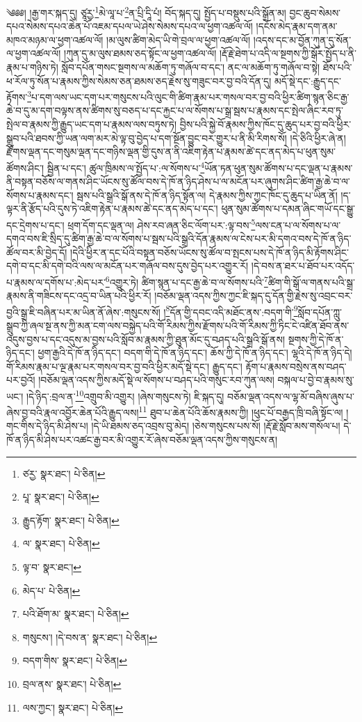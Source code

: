 \setcounter{footnote}{0} 
༄༅༅། །རྒྱ་གར་སྐད་དུ། ཙཱརྱ་\footnote{ཙརྱ་  སྣར་ཐང་།  པེ་ཅིན། }མེ་ལཱ་པ་\footnote{པཱ་  སྣར་ཐང་།  པེ་ཅིན། }ན་པྲི་དཱི་པཾ། བོད་སྐད་དུ། སྤྱོད་པ་བསྡུས་པའི་སྒྲོན་མ། བྱང་ཆུབ་སེམས་དཔའ་སེམས་དཔའ་ཆེན་པོ་འཇམ་དཔལ་ཡེ་ཤེས་སེམས་དཔའ་ལ་ཕྱག་འཚལ་ལོ། །དངོས་མེད་རྣམ་དག་ནམ་མཁའ་མཉམ་ལ་ཕྱག་འཚལ་ལོ། །མ་ལུས་ཚིག་མེད་ཡི་གེ་བྲལ་ལ་ཕྱག་འཚལ་ལོ། །འདས་དང་མ་བྱོན་ཀུན་དུ་སོན་ལ་ཕྱག་འཚལ་ལོ། །ཀུན་དུ་མ་ལུས་ཐམས་ཅད་སྟོང་ལ་ཕྱག་འཚལ་ལོ། །རྡོ་རྗེ་ཐེག་པ་འདི་ལ་སྔགས་ཀྱི་སྒོར་སྤྱོད་པ་ནི་རྣམ་པ་གཉིས་ཏེ། སློབ་དཔོན་གསང་སྔགས་ལ་མཆོག་ཏུ་གཞོལ་བ་དང་། ནང་ལ་མཆོག་ཏུ་གཞོལ་བ་སྟེ། ཐོས་པའི་ཕ་རོལ་ཏུ་སོན་པ་རྣམས་ཀྱིས་སེམས་ཅན་ཐམས་ཅད་རྗེས་སུ་གཟུང་བར་བྱ་བའི་དོན་དུ། མདོ་སྡེ་དང་:རྒྱུད་དང་རྟོགས་\footnote{རྒྱུད་རྟོག་  སྣར་ཐང་།  པེ་ཅིན། }པ་དག་ལས་ཡང་དག་པར་གསུངས་པའི་ལུང་གི་ཚིག་རྣམ་པར་གསལ་བར་བྱ་བའི་ཕྱིར་ཚིག་སྙན་ཅིང་རྒྱ་ཆེ་བ་དུ་མ་དག་བལྟས་ནས་ཚིགས་སུ་བཅད་པ་དང་རྐྱང་པ་ལ་སོགས་པ་སྒྲ་སྦས་པ་རྣམས་དང་སྤེལ་ཞིང་རབ་ཏུ་སྤེལ་བ་རྣམས་ཀྱི་རྒྱུད་ཡང་དག་པ་རྣམས་ལས་བཏུས་ཏེ། བྱིས་པའི་སྐྱེ་བོ་རྣམས་ཀྱིས་ཁོང་དུ་ཆུད་པར་བྱ་བའི་ཕྱིར་སྒྲུབ་པའི་ཐབས་ཀྱི་ཡན་ལག་མར་མེ་ལྟ་བུ་བྱེད་པ་དག་སྔོན་བྱུང་བར་གྱུར་པ་ནི་མི་རིགས་སོ། །དེ་ཅིའི་ཕྱིར་ཞེ་ན། རྫོགས་ལྡན་དང་གསུམ་ལྡན་དང་གཉིས་ལྡན་གྱི་དུས་ན་ནི་འཇིག་རྟེན་པ་རྣམས་ཚེ་དང་ནད་མེད་པ་ཕུན་སུམ་ཚོགས་ཤིང་། སྦྱིན་པ་དང་། ཚུལ་ཁྲིམས་ལ་སྤྱོད་པ་:ལ་སོགས་པ་\footnote{ལ་  སྣར་ཐང་།  པེ་ཅིན། }ཡོན་ཏན་ཕུན་སུམ་ཚོགས་པ་དང་ལྡན་པ་རྣམས་ནི་བསྟན་བཅོས་ལ་གནས་ཤིང་ཡོངས་སུ་ཚོལ་བས་དེ་ཁོ་ན་ཉིད་ཤེས་པ་ལ་མངོན་པར་ཞུགས་ཤིང་ཚིག་རྒྱ་ཆེ་བ་ལ་སོགས་པ་རྣམས་དང་། སྦས་པའི་སྒྲའི་སྒོ་ནས་དེ་ཁོ་ན་ཉིད་སྟོན་ལ། དེ་རྣམས་ཀྱིས་ཀྱང་ཁོང་དུ་ཆུད་པ་ཡིན་ནོ། །ད་ལྟར་ནི་རྩོད་པའི་དུས་ཏེ་འཇིག་རྟེན་པ་རྣམས་ཚེ་དང་ནད་མེད་པ་དང་། ཕུན་སུམ་ཚོགས་པ་དམན་ཞིང་གཡོ་དང་སྒྱུ་དང་དྲེགས་པ་དང་། ཕྲག་དོག་དང་ལྡན་ལ། ཤེས་རབ་ཞན་ཅིང་ལོག་པར་:ལྟ་བས་\footnote{ལྟ་བ་  སྣར་ཐང་། }ལས་ངན་པ་ལ་སོགས་པ་ལ་དགའ་བས་ཇི་སྲིད་དུ་ཚིག་རྒྱ་ཆེ་བ་ལ་སོགས་པ་སྦས་པའི་སྒྲའི་དོན་རྣམས་ལ་ངེས་པར་མི་དགའ་བས་དེ་ཁོ་ན་ཉིད་ཚོལ་བར་མི་བྱེད་དོ། །དེའི་ཕྱིར་ན་དང་པོའི་བསྟན་བཅོས་ཡོངས་སུ་ཚོལ་བ་སྤངས་པས་དེ་ཁོ་ན་ཉིད་མི་རྟོགས་ཤིང་དགེ་བ་དང་མི་དགེ་བའི་ལས་ལ་མངོན་པར་གཞོལ་བས་དུས་བྱེད་པར་འགྱུར་རོ། །དེ་བས་ན་ཐར་པ་ཐོབ་པར་འདོད་པ་རྣམས་ལ་དགོས་པ་:མེད་པར་\footnote{མེད་པ་  པེ་ཅིན། }འགྱུར་ཏེ། ཚིག་སྙན་པ་དང་རྒྱ་ཆེ་བ་ལ་སོགས་པའི་\footnote{པའི་ཐོག་མ་  སྣར་ཐང་།  པེ་ཅིན། }ཚིག་གི་སྒོ་ལ་གནས་པའི་སྒྲ་རྣམས་ནི་གཟིངས་དང་འདྲ་བ་ཡིན་པའི་ཕྱིར་རོ། །བཅོམ་ལྡན་འདས་ཀྱིས་ཀྱང་ཇི་སྐད་དུ་དོན་གྱི་རྗེས་སུ་འབྲང་བར་བྱའི་སྒྲ་ཇི་བཞིན་པར་མ་ཡིན་ནོ་ཞེས་:གསུངས་སོ། །\footnote{གསུངས་། །དེ་བས་ན་  སྣར་ཐང་།  པེ་ཅིན། }དོན་གྱི་དབང་འདི་མཐོང་ནས་:བདག་གི་\footnote{བདག་གིས་  སྣར་ཐང་།  པེ་ཅིན། }སློབ་དཔོན་ཀླུ་སྒྲུབ་ཀྱི་ཞལ་སྔ་ནས་ཀྱི་མན་ངག་ལས་བསྐྱེད་པའི་གོ་རིམས་ཀྱིས་རྫོགས་པའི་གོ་རིམས་ཀྱི་ཏིང་ངེ་འཛིན་ཐོབ་ནས་འདུས་བྱས་པ་དང་འདུས་མ་བྱས་པའི་སློབ་མ་རྣམས་ཀྱི་ཐུན་མོང་དུ་བཤད་པའི་སྒྲའི་སྒོ་ནས། སྔགས་ཀྱི་དེ་ཁོ་ན་ཉིད་དང་། ཕྱག་རྒྱའི་དེ་ཁོ་ན་ཉིད་དང་། བདག་གི་དེ་ཁོ་ན་ཉིད་དང་། ཆོས་ཀྱི་དེ་ཁོ་ན་ཉིད་དང་། ལྷའི་དེ་ཁོ་ན་ཉིད་དེ། གོ་རིམས་རྣམ་པ་ལྔ་རྣམ་པར་གསལ་བར་བྱ་བའི་ཕྱིར་མདོ་སྡེ་དང་། རྒྱུད་དང་། རྟོག་པ་རྣམས་བསྲེས་ནས་བཤད་པར་བྱའོ། །བཅོམ་ལྡན་འདས་ཀྱིས་མདོ་སྡེ་ལ་སོགས་པ་བཤད་པའི་གསུང་རབ་ཀུན་ལས། བསྐལ་པ་བྱེ་བ་རྣམས་སུ་ཡང་། །དེ་ཉིད་:བྲལ་ན་\footnote{བྲལ་ནས་  སྣར་ཐང་།  པེ་ཅིན། }འགྲུབ་མི་འགྱུར། །ཞེས་གསུངས་ཏེ། ཇི་སྐད་དུ། བཅོམ་ལྡན་འདས་ལ་ལྷ་མོ་བཞིས་ཞུས་པ་ཞེས་བྱ་བའི་རྣལ་འབྱོར་ཆེན་པོའི་རྒྱུད་ལས།\footnote{ལས་ཀྱང་།  སྣར་ཐང་།  པེ་ཅིན། } ཐུབ་པ་ཆེན་པོའི་ཆོས་རྣམས་ཀྱི། །ཕུང་པོ་བརྒྱད་ཁྲི་བཞི་སྟོང་ལ། །གང་གིས་དེ་ཉིད་མི་ཤེས་པ། །དེ་ཡི་ཐམས་ཅད་འབྲས་བུ་མེད། །ཅེས་གསུངས་པས་སོ། །རྡོ་རྗེ་སློབ་མས་གསོལ་པ། དེ་ཁོ་ན་ཉིད་མི་ཤེས་པར་འཚང་རྒྱ་བར་མི་འགྱུར་རོ་ཞེས་བཅོམ་ལྡན་འདས་ཀྱིས་གསུངས་ན། 